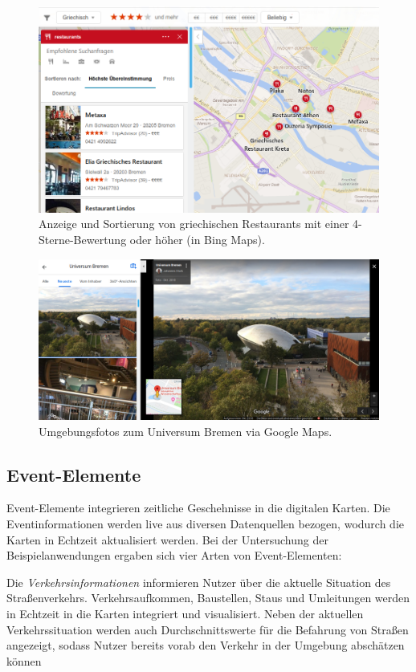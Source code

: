 \begin{figure}[p]
	\includegraphics[width=\linewidth]{figures/map-app_examples/bm_filter_sorting}
	\caption{Anzeige und Sortierung von griechischen Restaurants mit einer 4-Sterne-Bewertung oder höher (in Bing Maps).}
	\label{fig:bm_sorting}
\end{figure}
\begin{figure}[p]
	\centering
	\includegraphics[width=\linewidth]{figures/map-app_examples/gm_photos_2}
	\caption{Umgebungsfotos zum Universum Bremen via Google Maps.}
	\label{fig:gm_photos}
\end{figure}

\subsection{Event-Elemente}
\label{ssec:event-elements}
Event-Elemente integrieren zeitliche Geschehnisse in die digitalen Karten.
Die Eventinformationen werden live aus diversen Datenquellen bezogen, wodurch die Karten in Echtzeit aktualisiert werden.
Bei der Untersuchung der Beispielanwendungen ergaben sich vier Arten von Event-Elementen:

Die \emph{Verkehrsinformationen} informieren Nutzer über die aktuelle Situation des Straßenverkehrs.
Verkehrsaufkommen, Baustellen, Staus und Umleitungen werden in Echtzeit in die Karten integriert und visualisiert.
Neben der aktuellen Verkehrssituation werden auch Durchschnittswerte für die Befahrung von Straßen angezeigt, sodass Nutzer bereits vorab den Verkehr in der Umgebung abschätzen können

